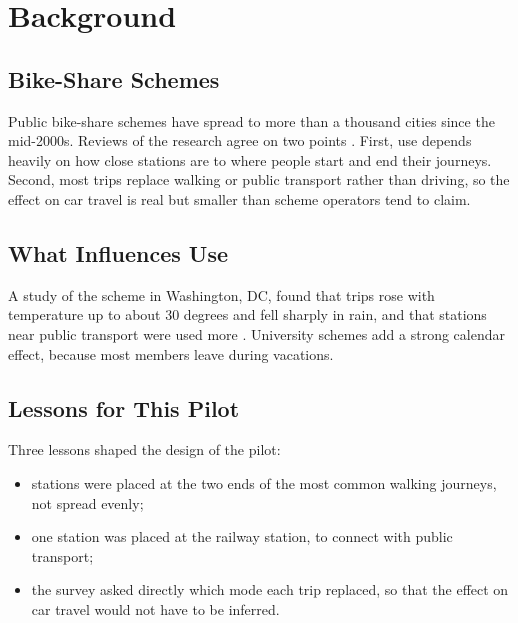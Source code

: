 \chapter{Background}\label{ch:background}

\section{Bike-Share Schemes}
Public bike-share schemes have spread to more than a thousand cities since the mid-2000s. Reviews of the research agree on two points \cite{fishman2013bike,shaheen2010bikesharing}. First, use depends heavily on how close stations are to where people start and end their journeys. Second, most trips replace walking or public transport rather than driving, so the effect on car travel is real but smaller than scheme operators tend to claim.

\section{What Influences Use}
A study of the scheme in Washington, DC, found that trips rose with temperature up to about 30 degrees and fell sharply in rain, and that stations near public transport were used more \cite{gebhart2014impact}. University schemes add a strong calendar effect, because most members leave during vacations.

\section{Lessons for This Pilot}
Three lessons shaped the design of the pilot:
\begin{itemize}
  \item stations were placed at the two ends of the most common walking journeys, not spread evenly;
  \item one station was placed at the railway station, to connect with public transport;
  \item the survey asked directly which mode each trip replaced, so that the effect on car travel would not have to be inferred.
\end{itemize}
